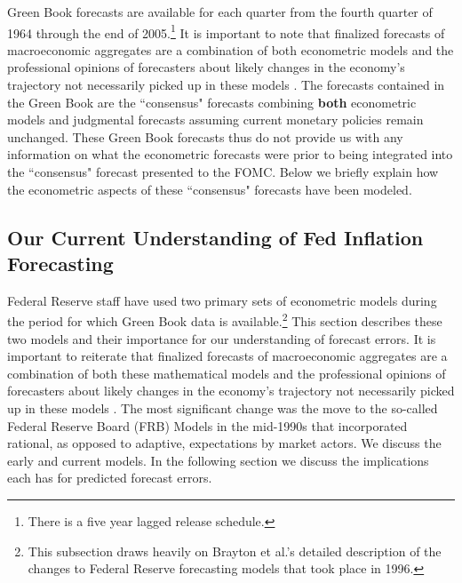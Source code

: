 \documentclass[a4paper]{article}\usepackage{graphicx, color}
\begin{document}
Green Book forecasts are available for each quarter from the fourth quarter of 1964 through the end of 2005.\footnote{There is a five year lagged release schedule.} It is important to note that finalized forecasts of macroeconomic aggregates are a combination of both econometric models and the professional opinions of forecasters about likely changes in the economy's trajectory not necessarily picked up in these models \citep{Karamouzis1989,Reifschneider1997}. The forecasts contained in the Green Book are the ``consensus" forecasts combining {\bf{both}} econometric models and judgmental forecasts assuming current monetary policies remain unchanged. These Green Book forecasts thus do not provide us with any information on what the econometric forecasts were prior to being integrated into the ``consensus" forecast presented to the FOMC. Below we briefly explain how the econometric aspects of these ``consensus" forecasts have been modeled.

\subsection{Our Current Understanding of Fed Inflation Forecasting}

Federal Reserve staff have used two primary sets of econometric models during the period for which Green Book data is available.\footnote{This subsection draws heavily on Brayton et al.'s \cite{Brayton1997} detailed description of the changes to Federal Reserve forecasting models that took place in 1996.} This section describes these two models and their importance for our understanding of forecast errors. It is important to reiterate that finalized forecasts of macroeconomic aggregates are a combination of both these mathematical models and the professional opinions of forecasters about likely changes in the economy's trajectory not necessarily picked up in these models \citep{Karamouzis1989,Reifschneider1997,Taylor1997}. The most significant change was the move to the so-called Federal Reserve Board (FRB) Models in the mid-1990s that incorporated rational, as opposed to adaptive, expectations by market actors. We discuss the early and current models. In the following section we discuss the implications each has for predicted forecast errors.
\end{document}
